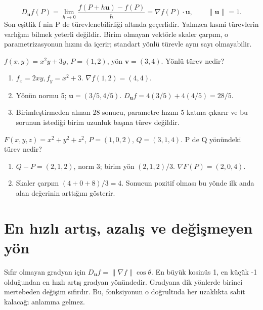 {\small\[
D_{\mathbf u}f(P)=\lim_{h\to0}\frac{f(P+h\mathbf u)-f(P)}h=\nabla f(P)\cdot\mathbf u,\qquad\|\mathbf u\|=1.
\]}
Son eşitlik f nin P de türevlenebilirliği altında geçerlidir. Yalnızca kısmi türevlerin varlığını bilmek yeterli değildir. Birim olmayan vektörle skaler çarpım, o parametrizasyonun hızını da içerir; standart yönlü türevle aynı sayı olmayabilir.

\begin{tcolorbox}[title={Örnek 6.9 | Birim olmayan yönden yönlü türev},colframe=accent]\(f(x,y)=x^2y+3y\), \(P=(1,2)\), yön \(\mathbf v=(3,4)\). Yönlü türev nedir?
\par\vspace{1mm}{\scriptsize\sffamily Pekiştirme}\end{tcolorbox}
\begin{tcolorbox}[title={Adım adım çözüm},colback=green!3!white,colframe=green]\begin{enumerate}
\item \(f_x=2xy,f_y=x^2+3\). \(\nabla f(1,2)=(4,4)\).
\item Yönün normu 5; \(\mathbf u=(3/5,4/5)\). \(D_{\mathbf u}f=4(3/5)+4(4/5)=28/5\).
\item Birimleştirmeden alınan 28 sonucu, parametre hızını 5 katına çıkarır ve bu sorunun istediği birim uzunluk başına türev değildir.
\end{enumerate}\end{tcolorbox}
\begin{tcolorbox}[title={Örnek 6.10 | P den Q ya doğru değişim},colframe=accent]\(F(x,y,z)=x^2+y^2+z^2\), \(P=(1,0,2)\), \(Q=(3,1,4)\). P de Q yönündeki türev nedir?
\par\vspace{1mm}{\scriptsize\sffamily Pekiştirme}\end{tcolorbox}
\begin{tcolorbox}[title={Adım adım çözüm},colback=green!3!white,colframe=green]\begin{enumerate}
\item \(Q-P=(2,1,2)\), norm 3; birim yön \((2,1,2)/3\). \(\nabla F(P)=(2,0,4)\).
\item Skaler çarpım \((4+0+8)/3=4\). Sonucun pozitif olması bu yönde ilk anda alan değerinin arttığını gösterir.
\end{enumerate}\end{tcolorbox}
\section{En hızlı artış, azalış ve değişmeyen yön}
Sıfır olmayan gradyan için \(D_{\mathbf u}f=\|\nabla f\|\cos\theta\). En büyük kosinüs 1, en küçük -1 olduğundan en hızlı artış gradyan yönündedir. Gradyana dik yönlerde birinci mertebeden değişim sıfırdır. Bu, fonksiyonun o doğrultuda her uzaklıkta sabit kalacağı anlamına gelmez.


